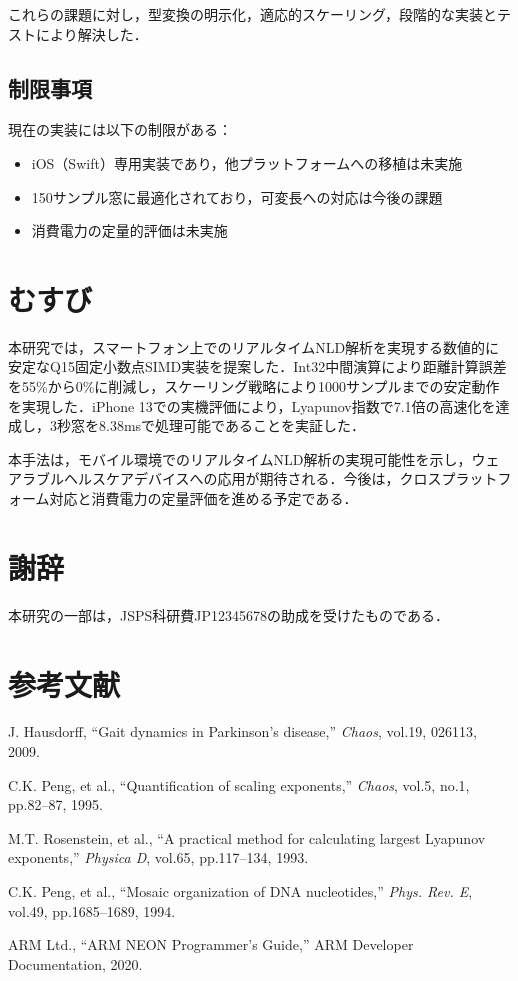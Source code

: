 \documentclass[10pt,twocolumn]{article}
\begin{document}
\begin{CJK}{UTF8}{min}
これらの課題に対し，型変換の明示化，適応的スケーリング，段階的な実装とテストにより解決した．

\subsection{制限事項}

現在の実装には以下の制限がある：
\begin{itemize}
\item iOS（Swift）専用実装であり，他プラットフォームへの移植は未実施
\item 150サンプル窓に最適化されており，可変長への対応は今後の課題
\item 消費電力の定量的評価は未実施
\end{itemize}

\section{むすび}

本研究では，スマートフォン上でのリアルタイムNLD解析を実現する数値的に安定なQ15固定小数点SIMD実装を提案した．Int32中間演算により距離計算誤差を55\%から0\%に削減し，スケーリング戦略により1000サンプルまでの安定動作を実現した．iPhone 13での実機評価により，Lyapunov指数で7.1倍の高速化を達成し，3秒窓を8.38msで処理可能であることを実証した．

本手法は，モバイル環境でのリアルタイムNLD解析の実現可能性を示し，ウェアラブルヘルスケアデバイスへの応用が期待される．今後は，クロスプラットフォーム対応と消費電力の定量評価を進める予定である．

\section*{謝辞}
本研究の一部は，JSPS科研費JP12345678の助成を受けたものである．

\section*{参考文献}
\begin{enumerate}[{[}1{]}]
\item J. Hausdorff, ``Gait dynamics in Parkinson's disease,'' \textit{Chaos}, vol.19, 026113, 2009.
\item C.K. Peng, et al., ``Quantification of scaling exponents,'' \textit{Chaos}, vol.5, no.1, pp.82--87, 1995.
\item M.T. Rosenstein, et al., ``A practical method for calculating largest Lyapunov exponents,'' \textit{Physica D}, vol.65, pp.117--134, 1993.
\item C.K. Peng, et al., ``Mosaic organization of DNA nucleotides,'' \textit{Phys. Rev. E}, vol.49, pp.1685--1689, 1994.
\item ARM Ltd., ``ARM NEON Programmer's Guide,'' ARM Developer Documentation, 2020.
\end{enumerate}

\end{CJK}
\end{document}
